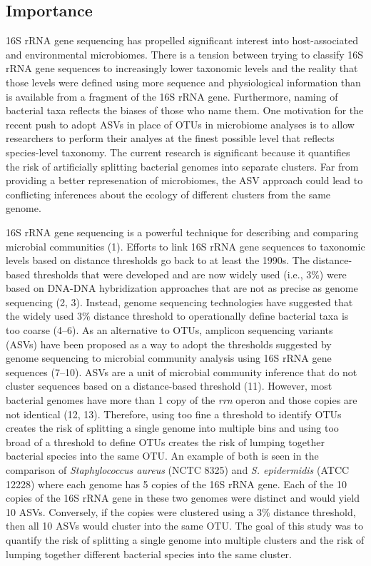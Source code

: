\documentclass[
]{article}
\begin{document}
\hypertarget{importance}{%
\subsection{Importance}\label{importance}}

16S rRNA gene sequencing has propelled significant interest into
host-associated and environmental microbiomes. There is a tension
between trying to classify 16S rRNA gene sequences to increasingly lower
taxonomic levels and the reality that those levels were defined using
more sequence and physiological information than is available from a
fragment of the 16S rRNA gene. Furthermore, naming of bacterial taxa
reflects the biases of those who name them. One motivation for the
recent push to adopt ASVs in place of OTUs in microbiome analyses is to
allow researchers to perform their analyes at the finest possible level
that reflects species-level taxonomy. The current research is
significant because it quantifies the risk of artificially splitting
bacterial genomes into separate clusters. Far from providing a better
represenation of microbiomes, the ASV approach could lead to conflicting
inferences about the ecology of different clusters from the same genome.

\newpage

16S rRNA gene sequencing is a powerful technique for describing and
comparing microbial communities (1). Efforts to link 16S rRNA gene
sequences to taxonomic levels based on distance thresholds go back to at
least the 1990s. The distance-based thresholds that were developed and
are now widely used (i.e., 3\%) were based on DNA-DNA hybridization
approaches that are not as precise as genome sequencing (2, 3). Instead,
genome sequencing technologies have suggested that the widely used 3\%
distance threshold to operationally define bacterial taxa is too coarse
(4--6). As an alternative to OTUs, amplicon sequencing variants (ASVs)
have been proposed as a way to adopt the thresholds suggested by genome
sequencing to microbial community analysis using 16S rRNA gene sequences
(7--10). ASVs are a unit of microbial community inference that do not
cluster sequences based on a distance-based threshold (11). However,
most bacterial genomes have more than 1 copy of the \emph{rrn} operon
and those copies are not identical (12, 13). Therefore, using too fine a
threshold to identify OTUs creates the risk of splitting a single genome
into multiple bins and using too broad of a threshold to define OTUs
creates the risk of lumping together bacterial species into the same
OTU. An example of both is seen in the comparison of
\emph{Staphylococcus aureus} (NCTC 8325) and \emph{S. epidermidis} (ATCC
12228) where each genome has 5 copies of the 16S rRNA gene. Each of the
10 copies of the 16S rRNA gene in these two genomes were distinct and
would yield 10 ASVs. Conversely, if the copies were clustered using a
3\% distance threshold, then all 10 ASVs would cluster into the same
OTU. The goal of this study was to quantify the risk of splitting a
single genome into multiple clusters and the risk of lumping together
different bacterial species into the same cluster.
\end{document}
